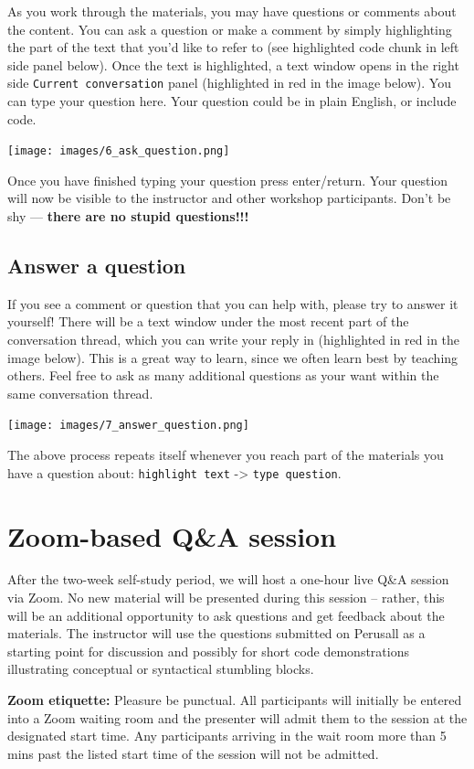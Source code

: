 \documentclass[]{book}
\begin{document}
As you work through the materials, you may have questions or comments about the content. You can ask a question or make a comment by simply highlighting the part of the text that you'd like to refer to (see highlighted code chunk in left side panel below). Once the text is highlighted, a text window opens in the right side \texttt{Current\ conversation} panel (highlighted in red in the image below). You can type your question here. Your question could be in plain English, or include code.

\texttt{[image: images/6\_ask\_question.png]}

Once you have finished typing your question press enter/return. Your question will now be visible to the instructor and other workshop participants. Don't be shy --- \textbf{there are no stupid questions!!!}

\hypertarget{answer-a-question}{%
\section{Answer a question}\label{answer-a-question}}

If you see a comment or question that you can help with, please try to answer it yourself! There will be a text window under the most recent part of the conversation thread, which you can write your reply in (highlighted in red in the image below). This is a great way to learn, since we often learn best by teaching others. Feel free to ask as many additional questions as your want within the same conversation thread.

\texttt{[image: images/7\_answer\_question.png]}

The above process repeats itself whenever you reach part of the materials you have a question about: \texttt{highlight\ text} -\textgreater{} \texttt{type\ question}.

\hypertarget{zoom-based-qa-session}{%
\chapter*{Zoom-based Q\&A session}\label{zoom-based-qa-session}}

After the two-week self-study period, we will host a one-hour live Q\&A session via Zoom. No new material will be presented during this session -- rather, this will be an additional opportunity to ask questions and get feedback about the materials. The instructor will use the questions submitted on Perusall as a starting point for discussion and possibly for short code demonstrations illustrating conceptual or syntactical stumbling blocks.

\textbf{Zoom etiquette:} Pleasure be punctual. All participants will initially be entered into a Zoom waiting room and the presenter will admit them to the session at the designated start time. Any participants arriving in the wait room more than 5 mins past the listed start time of the session will not be admitted.
\end{document}
